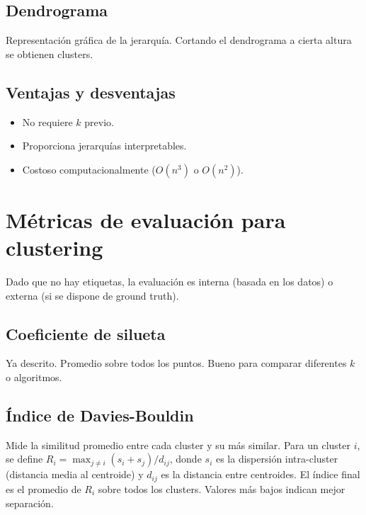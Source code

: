 \documentclass[12pt,a4paper,openany,oneside]{book}
\begin{document}
\subsection{Dendrograma}
Representación gráfica de la jerarquía. Cortando el dendrograma a cierta altura se obtienen clusters.

\begin{center}
\caption{Ejemplo de dendrograma con 4 puntos.}
\end{center}

\subsection{Ventajas y desventajas}
\begin{itemize}
    \item No requiere \(k\) previo.
    \item Proporciona jerarquías interpretables.
    \item Costoso computacionalmente (\(O(n^3)\) o \(O(n^2)\)).
\end{itemize}

\section{Métricas de evaluación para clustering}

Dado que no hay etiquetas, la evaluación es interna (basada en los datos) o externa (si se dispone de ground truth).

\subsection{Coeficiente de silueta}
Ya descrito. Promedio sobre todos los puntos. Bueno para comparar diferentes \(k\) o algoritmos.

\subsection{Índice de Davies-Bouldin}
Mide la similitud promedio entre cada cluster y su más similar. Para un cluster \(i\), se define \(R_i = \max_{j \neq i} (s_i + s_j) / d_{ij}\), donde \(s_i\) es la dispersión intra-cluster (distancia media al centroide) y \(d_{ij}\) es la distancia entre centroides. El índice final es el promedio de \(R_i\) sobre todos los clusters. Valores más bajos indican mejor separación.
\end{document}
